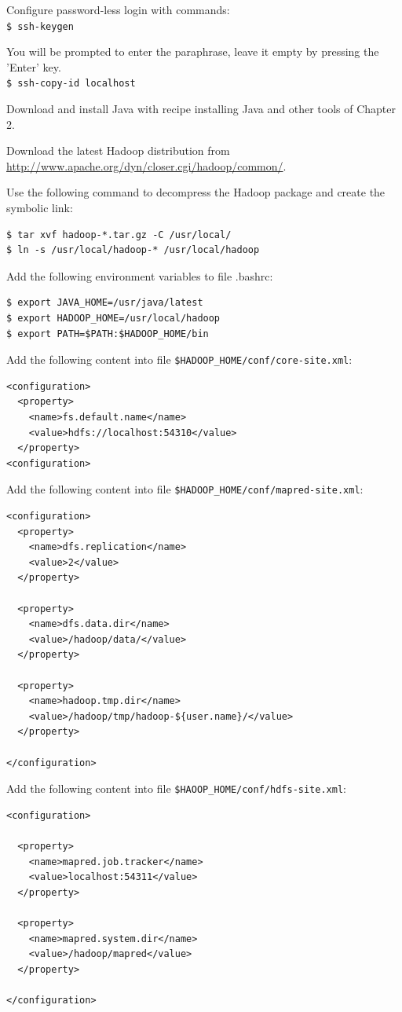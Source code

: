 Configure password-less login with commands: \\
\verb|$ ssh-keygen|


You will be prompted to enter the paraphrase, leave it empty by pressing the 'Enter' key. \\
\verb|$ ssh-copy-id localhost|

Download and install Java with recipe installing Java and other tools of Chapter 2.


Download the latest Hadoop distribution from \url{http://www.apache.org/dyn/closer.cgi/hadoop/common/}.


Use the following command to decompress the Hadoop package and create the symbolic link:
\lstset{style=bashstyle}
\begin{lstlisting}
$ tar xvf hadoop-*.tar.gz -C /usr/local/
$ ln -s /usr/local/hadoop-* /usr/local/hadoop
\end{lstlisting}


Add the following environment variables to file .bashrc: 
\lstset{style=bashstyle}
\begin{lstlisting}
$ export JAVA_HOME=/usr/java/latest
$ export HADOOP_HOME=/usr/local/hadoop
$ export PATH=$PATH:$HADOOP_HOME/bin
\end{lstlisting}

Add the following content into file \verb|$HADOOP_HOME/conf/core-site.xml|:
\lstset{style=bashstyle}
\begin{lstlisting}
<configuration>
  <property>
    <name>fs.default.name</name>
    <value>hdfs://localhost:54310</value>
  </property>
<configuration>
\end{lstlisting}

Add the following content into file \verb|$HADOOP_HOME/conf/mapred-site.xml|:
\lstset{style=bashstyle}
\begin{lstlisting}
<configuration>
  <property>
    <name>dfs.replication</name>
    <value>2</value>
  </property>

  <property>
    <name>dfs.data.dir</name>
    <value>/hadoop/data/</value>
  </property>

  <property>
    <name>hadoop.tmp.dir</name>
    <value>/hadoop/tmp/hadoop-${user.name}/</value>
  </property>

</configuration>
\end{lstlisting}


Add the following content into file \verb|$HAOOP_HOME/conf/hdfs-site.xml|:
\lstset{style=bashstyle}
\begin{lstlisting}
<configuration>

  <property>
    <name>mapred.job.tracker</name>
    <value>localhost:54311</value>
  </property>

  <property>
    <name>mapred.system.dir</name>
    <value>/hadoop/mapred</value>
  </property>

</configuration>
\end{lstlisting}


